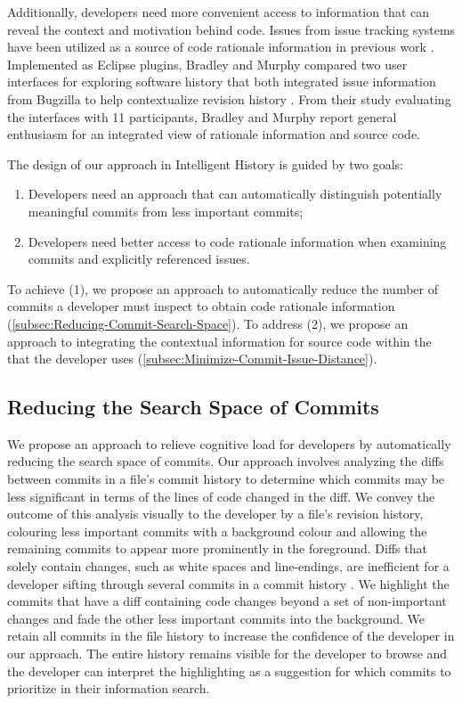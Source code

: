 Additionally, developers need more convenient access
to information that can reveal the context and motivation behind code.
Issues from issue tracking systems have been utilized as a source of
code rationale information in previous work \cite{rastkar_why_2013,moreno_arena_2017,bradley_supporting_2011}.
Implemented as Eclipse  plugins, Bradley and Murphy compared two user interfaces 
for exploring software history that both integrated issue information
from Bugzilla to help contextualize revision history \cite{bradley_supporting_2011}.
From their study evaluating the interfaces with 11 participants, Bradley and Murphy report general enthusiasm for
an integrated view of rationale information and source code.

The design of our approach in Intelligent History is guided by two goals: 

\begin{enumerate}[label={(\arabic*)}]
    \item Developers need an approach that can automatically distinguish potentially meaningful commits from less important commits;
    \item Developers need better access to code rationale information when examining commits and explicitly referenced issues.
\end{enumerate}

To achieve (1), we propose an approach to automatically reduce the number of commits a developer must inspect to obtain code rationale information (\autoref{subsec:Reducing-Commit-Search-Space}).
To address (2), we propose an approach to integrating the contextual information for source code within the  that the developer uses (\autoref{subsec:Minimize-Commit-Issue-Distance}).

\subsection{Reducing the Search Space of Commits}
\label{subsec:Reducing-Commit-Search-Space}

We propose an approach to relieve cognitive load for developers by automatically reducing the search space of commits.
Our approach involves analyzing the diffs between commits in a file's commit history to determine 
which commits may be less significant in terms of the lines of code changed in the diff.
We convey the outcome of this analysis visually to the developer by  a file's revision history, 
colouring less important commits with a background colour and allowing the remaining commits to appear more prominently in the foreground.
Diffs that solely contain  changes, such as white spaces and line-endings, are inefficient 
for a developer sifting through several commits in a commit history \cite{codoban_software_2015}.
We highlight the commits that have a diff containing code changes beyond a set of non-important changes 
and fade the other less important commits into the background.
We retain all commits in the file history to increase the confidence of the developer in our approach.
The entire history remains visible for the developer to browse 
and the developer can interpret the highlighting as a suggestion for which commits to prioritize in their information search.

